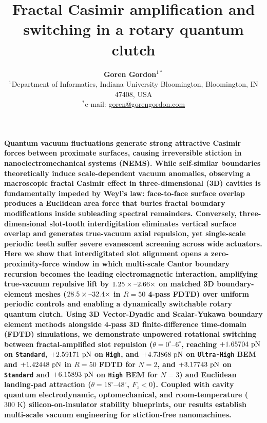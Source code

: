 \documentclass[11pt,letterpaper]{article}
\title{\textbf{Fractal Casimir amplification and switching in a rotary quantum clutch}}
\author{\textbf{Goren Gordon}$^{1\ast}$ \\
\normalsize{$^{1}$Department of Informatics, Indiana University Bloomington, Bloomington, IN 47408, USA} \\
\normalsize{$^{\ast}$e-mail: \href{mailto:goren@gorengordon.com}{goren@gorengordon.com}}}
\date{}
\begin{document}
\maketitle

\noindent\textbf{%
Quantum vacuum fluctuations generate strong attractive Casimir forces between proximate surfaces, causing irreversible stiction in nanoelectromechanical systems (NEMS)\cite{casimir1948,rodriguez2011}. While self-similar boundaries theoretically induce scale-dependent vacuum anomalies\cite{shajesh2016,gordon2026prd}, observing a macroscopic fractal Casimir effect in three-dimensional (3D) cavities is fundamentally impeded by Weyl's law: face-to-face surface overlap produces a Euclidean area force that buries fractal boundary modifications inside subleading spectral remainders\cite{lapidus1991}. Conversely, three-dimensional slot-tooth interdigitation eliminates vertical surface overlap and generates true-vacuum axial repulsion\cite{levin2010}, yet single-scale periodic teeth suffer severe evanescent screening across wide actuators. Here we show that interdigitated slot alignment opens a zero-proximity-force window in which multi-scale Cantor boundary recursion becomes the leading electromagnetic interaction, amplifying true-vacuum repulsive lift by $1.25{}\times\text{--}2.66{}\times$ on matched 3D boundary-element meshes ($28.5{}\times\text{--}32.4{}\times$ in $R=50$ 4-pass FDTD) over uniform periodic controls and enabling a dynamically switchable rotary quantum clutch. Using 3D Vector-Dyadic and Scalar-Yukawa boundary element methods alongside 4-pass 3D finite-difference time-domain (FDTD) simulations, we demonstrate unpowered rotational switching between fractal-amplified slot repulsion ($\theta = 0^\circ\text{--}6^\circ$, reaching $+1.65704{}\text{ pN}$ on \texttt{Standard}, $+2.59171{}\text{ pN}$ on \texttt{High}, and $+4.73868{}\text{ pN}$ on \texttt{Ultra-High} BEM and $+1.42448{}\text{ pN}$ in $R=50$ FDTD for $N=2$, and $+3.17743{}\text{ pN}$ on \texttt{Standard} and $+6.15893{}\text{ pN}$ on \texttt{High} BEM for $N=3$) and Euclidean landing-pad attraction ($\theta = 18^\circ\text{--}48^\circ$, $F_z < 0$). Coupled with cavity quantum electrodynamic, optomechanical, and room-temperature ($300\text{ K}$) silicon-on-insulator stability blueprints, our results establish multi-scale vacuum engineering for stiction-free nanomachines.}
\end{document}
